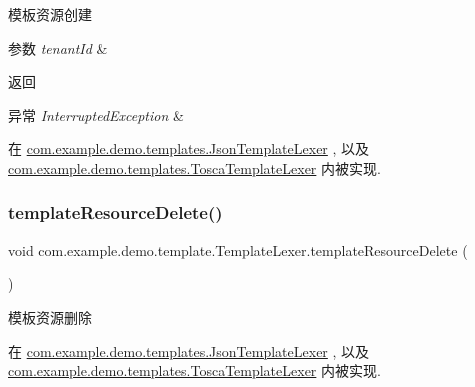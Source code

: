模板资源创建 
\begin{DoxyParams}{参数}
{\em tenant\+Id} & \\
\hline
\end{DoxyParams}
\begin{DoxyReturn}{返回}

\end{DoxyReturn}

\begin{DoxyExceptions}{异常}
{\em Interrupted\+Exception} & \\
\hline
\end{DoxyExceptions}


在 \mbox{\hyperlink{classcom_1_1example_1_1demo_1_1templates_1_1_json_template_lexer_a3fa64b0be8178fbde35894629b1c2c04}{com.\+example.\+demo.\+templates.\+Json\+Template\+Lexer}} , 以及 \mbox{\hyperlink{classcom_1_1example_1_1demo_1_1templates_1_1_tosca_template_lexer_a47a9186303228b682b6276712c8fa9cb}{com.\+example.\+demo.\+templates.\+Tosca\+Template\+Lexer}} 内被实现.

\mbox{\label{interfacecom_1_1example_1_1demo_1_1template_1_1_template_lexer_a7617e70e95636b863a50f1a72d81e28f}} 
\subsubsection{\texorpdfstring{template\+Resource\+Delete()}{templateResourceDelete()}}
{\footnotesize\ttfamily void com.\+example.\+demo.\+template.\+Template\+Lexer.\+template\+Resource\+Delete (\begin{DoxyParamCaption}{ }\end{DoxyParamCaption})}

模板资源删除 

在 \mbox{\hyperlink{classcom_1_1example_1_1demo_1_1templates_1_1_json_template_lexer_a3e398dd2757e699d1c12e170a88d2a8c}{com.\+example.\+demo.\+templates.\+Json\+Template\+Lexer}} , 以及 \mbox{\hyperlink{classcom_1_1example_1_1demo_1_1templates_1_1_tosca_template_lexer_abe09d1bfc27e36f03e72859030538179}{com.\+example.\+demo.\+templates.\+Tosca\+Template\+Lexer}} 内被实现.

